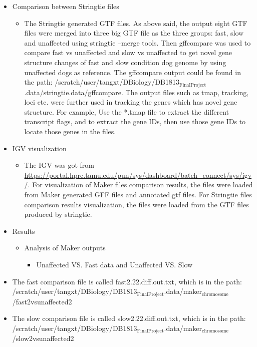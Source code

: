 \documentclass[11pt]{article}
\begin{document}
\begin{itemize}
\begin{itemize}
\end{itemize}

\item Comparison between Stringtie files

\begin{itemize}
\item The Stringtie generated GTF files. As above said, the output eight GTF files were merged into three big GTF file as the three groups: fast, slow and 
      unaffected using stringtie --merge tools. Then gffcompare was used to compare fast vs unaffected and slow vs unaffected to get novel gene structure changes
      of fast and slow condition dog genome by using unaffected dogs as reference. The gffcompare output could be found in the path:
      /scratch/user/tangxt/DBiology/DB1813$_{\mathrm{FinalProject}}$.data/stringtie.data/gffcompare. The output files such as tmap, tracking, loci etc. were further used in
      tracking the genes which has novel gene structure. For example, Use the *.tmap file to extract the different transcript flags, and to extract the gene IDs,
      then use those gene IDs to locate those genes in the files.
\end{itemize}

\item IGV visualization

\begin{itemize}
\item The IGV was got from \href{https://portal.hprc.tamu.edu/pun/sys/dashboard/batch_connect/sys/igv/}{https://portal.hprc.tamu.edu/pun/sys/dashboard/batch_connect/sys/igv/}. For visualization of Maker files comparison results, the files 
     were loaded from Maker generated GFF files and annotated.gtf files. For Stringtie files comparison results visualization, the files were loaded 
     from the GTF files produced by stringtie.
\end{itemize}

\item Results

\begin{itemize}
\item Analysis of Maker outputs

\begin{itemize}
\item Unaffected VS. Fast data and Unaffected VS. Slow
\end{itemize}

\end{itemize}

\item The fast comparison file is called fast2.22.diff.out.txt, which is in the path:
   /scratch/user/tangxt/DBiology/DB1813$_{\mathrm{FinalProject}}$.data/maker$_{\mathrm{chromosome}}$/fast2vsunaffected2
\item The slow comparison file is called slow2.22.diff.out.txt, which is in the path:
   /scratch/user/tangxt/DBiology/DB1813$_{\mathrm{FinalProject}}$.data/maker$_{\mathrm{chromosome}}$/slow2vsunaffected2


\end{itemize}
\end{document}
